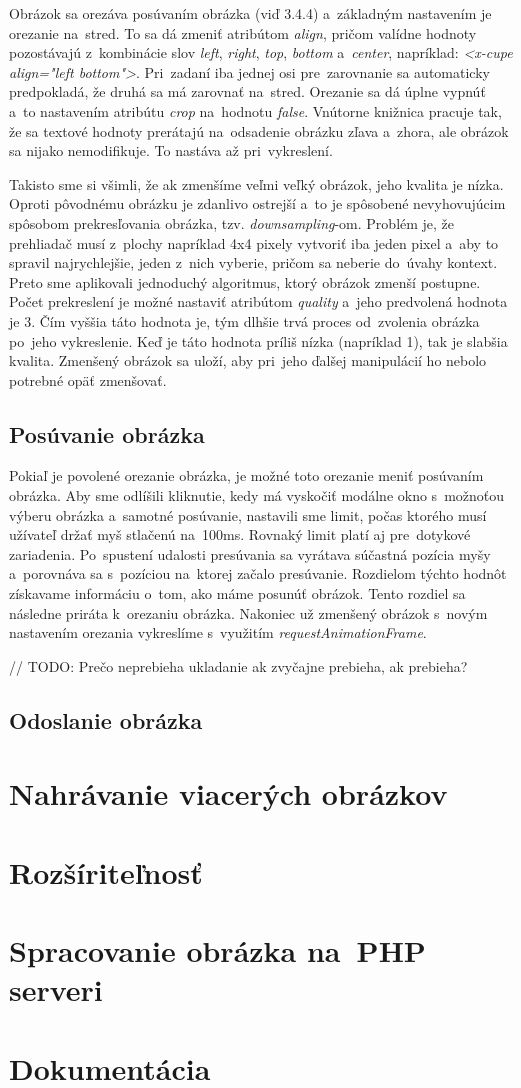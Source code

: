 Obrázok sa orezáva posúvaním obrázka (viď 3.4.4) a~základným nastavením je orezanie na~stred. To sa dá zmeniť atribútom \emph{align}, pričom valídne hodnoty pozostávajú z~kombinácie slov \emph{left}, \emph{right}, \emph{top}, \emph{bottom} a~\emph{center}, napríklad: \emph{<x-cupe align="left bottom"\textgreater}. Pri~zadaní iba jednej osi pre~zarovnanie sa automaticky predpokladá, že druhá sa má zarovnať na~stred. Orezanie sa dá úplne vypnúť a~to nastavením atribútu \emph{crop} na~hodnotu \emph{false}. Vnútorne knižnica pracuje tak, že sa textové hodnoty prerátajú na~odsadenie obrázku zľava a~zhora, ale obrázok sa nijako nemodifikuje. To nastáva až pri~vykreslení.

Takisto sme si všimli, že ak zmenšíme veľmi veľký obrázok, jeho kvalita je nízka. Oproti pôvodnému obrázku je zdanlivo ostrejší a~to je spôsobené nevyhovujúcim spôsobom prekresľovania obrázka, tzv. \emph{downsampling}-om. Problém je, že prehliadač musí z~plochy napríklad 4x4 pixely vytvoriť iba jeden pixel a~aby to spravil najrychlejšie, jeden z~nich vyberie, pričom sa neberie do~úvahy kontext. Preto sme aplikovali jednoduchý algoritmus, ktorý obrázok zmenší postupne. Počet prekreslení je možné nastaviť atribútom \emph{quality} a~jeho predvolená hodnota je 3. Čím vyššia táto hodnota je, tým dlhšie trvá proces od~zvolenia obrázka po~jeho vykreslenie. Keď je táto hodnota príliš nízka (napríklad 1), tak je slabšia kvalita. Zmenšený obrázok sa uloží, aby pri~jeho ďalšej manipulácií ho nebolo potrebné opäť zmenšovať.

\subsection{Posúvanie obrázka}

Pokiaľ je povolené orezanie obrázka, je možné toto orezanie meniť posúvaním obrázka. Aby sme odlíšili kliknutie, kedy má vyskočiť modálne okno s~možnoťou výberu obrázka a~samotné posúvanie, nastavili sme limit, počas ktorého musí užívateľ držať myš stlačenú na~100ms. Rovnaký limit platí aj pre~dotykové zariadenia. Po~spustení udalosti presúvania sa vyrátava súčastná pozícia myšy a~porovnáva sa s~pozíciou na~ktorej začalo presúvanie. Rozdielom týchto hodnôt získavame informáciu o~tom, ako máme posunúť obrázok. Tento rozdiel sa následne priráta k~orezaniu obrázka. Nakoniec už zmenšený obrázok s~novým nastavením orezania vykreslíme s~využitím \emph{requestAnimationFrame}.

// TODO: Prečo neprebieha ukladanie ak zvyčajne prebieha, ak prebieha? 

\subsection{Odoslanie obrázka}

\section{Nahrávanie viacerých obrázkov}
\section{Rozšíriteľnosť}
\section{Spracovanie obrázka na~PHP serveri}
\section{Dokumentácia}